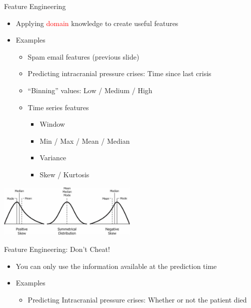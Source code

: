 \documentclass[aspectratio=169]{beamer}
\begin{document}
\begin{frame}{Feature Engineering}

\begin{itemize}
\item Applying \textcolor{red}{domain} knowledge to create useful features
\item Examples
\begin{itemize}
\item Spam email features (previous slide)
\item	Predicting intracranial pressure crises: Time since last crisis
\item ``Binning'' values: Low / Medium / High
\item Time series features
\begin{itemize}
	\item Window
	\item Min / Max / Mean / Median
	\item Variance
	\item Skew / Kurtosis 
\end{itemize}
\end{itemize}

\end{itemize}
    \includegraphics[width=0.5\textwidth]{lectSup/skew.jpeg}
\end{frame}
\begin{frame}{Feature Engineering: Don't Cheat!}

\begin{itemize}
\item You can only use the information available at the prediction time
\item Examples
\begin{itemize}
\item Predicting Intracranial pressure crises:  Whether or not the patient died %
\end{itemize}

\end{itemize}
\end{frame}
\end{document}
